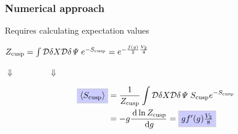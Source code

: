 \documentclass{beamer}
\begin{document}

\begin{frame}
\frametitle{Numerical approach}

Requires calculating expectation values\vspace{2mm}
{
\begin{tcolorbox}[colback=white!95!black, colframe=white!90!black]
\begin{center}
$Z_{\rm cusp} = \int \mathcal{D}\delta X\mathcal{D}\delta \mathit{\Psi} \; e^{-S_{\rm cusp}} = e^{-\frac{f(g)}{2}\frac{V_{2}}{4}}$
\end{center}
\end{tcolorbox} %
\begin{center}
$\Downarrow \qquad \qquad \Downarrow$
\end{center}
\begin{tcolorbox}[colback=white!95!black, colframe=white!90!black]
\begin{align*}
\fcolorbox{white!70!black}{white!80!blue}{$\langle S_{\rm cusp} \rangle $} &= \frac{1}{Z_{\rm cusp}} \int \mathcal{D}\delta X\mathcal{D}\delta \mathit{\Psi} \; S_{\rm cusp} e^{-S_{\rm cusp}} \\
&= -g \frac{\dd \ln Z_{\rm cusp}}{\dd g} = \fcolorbox{white!70!black}{white!80!blue}{$g f'(g) \frac{V_{2}}{8}$}
\end{align*}
\end{tcolorbox}
}
\end{frame}

\end{document}
